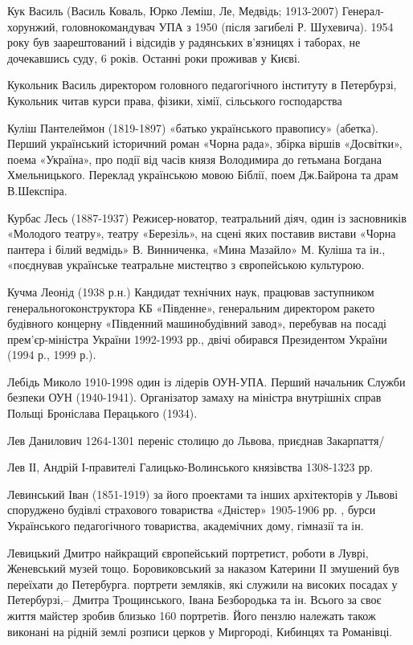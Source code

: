 Кук Василь (Василь Коваль, Юрко Леміш, Ле, Медвідь; 1913-2007) Генерал-хорунжий, головнокомандувач УПА з 1950 (після загибелі Р. Шухевича). 1954 року був заарештований і відсидів у радянських в'язницях і таборах, не дочекавшись суду, 6 років. Останні роки проживав у Києві.

Кукольник Василь директором головного педагогічного інституту в Петербурзі, Кукольник читав курси права, фізики, хімії, сільського господарства

Куліш Пантелеймон (1819-1897) «батько українського правопису» (абетка). Перший український історичний роман «Чорна рада», збірка віршів «Досвітки», поема «Україна»,  про події від часів князя Володимира до гетьмана Богдана Хмельницького. Переклад українською мовою Біблії, поем Дж.Байрона та драм В.Шекспіра.

Курбас Лесь (1887-1937) Режисер-новатор, театральний діяч, один із засновників «Молодого театру», театру «Березіль», на сцені яких поставив вистави «Чорна пантера і білий ведмідь» В. Винниченка, «Мина Мазайло» М. Куліша та ін., «поєднував українське театральне мистецтво з європейською культурою.

Кучма Леонід (1938 р.н.) Кандидат технічних наук, працював заступником генеральногоконструктора КБ «Південне», генеральним директором ракето будівного концерну «Південний машинобудівний завод», перебував на посаді прем’єр-міністра України 1992-1993 рр., двічі обирався Президентом України (1994 р., 1999 р.).

Лебідь Миколо 1910-1998 один із лідерів ОУН-УПА. Перший начальник Служби безпеки ОУН (1940-1941). Організатор замаху на міністра внутрішніх справ Польщі Броніслава Перацького (1934). 

Лев Данилович 1264-1301 переніс столицю до Львова, приєднав Закарпаття/

Лев ІІ, Андрій І-правителі Галицько-Волинського князівства 1308-1323 рр.

Левинський Іван (1851-1919) за його проектами та інших архітекторів у Львові споруджено будівлі страхового товариства «Дністер» 1905-1906 рр. , бурси Українського педагогічного товариства, академічних дому, гімназії та ін.

Левицький Дмитро найкращий європейський портретист, роботи в Луврі, Женевський музей тощо. Боровиковський за наказом Катерини ІІ змушений був переїхати до Петербурга. портрети земляків, які служили на високих посадах у Петербурзі,– Дмитра Трощинського, Івана Безбородька та ін. Всього за своє життя майстер зробив близько 160 портретів. Його пензлю належать також виконані на рідній землі розписи церков у Миргороді, Кибинцях та Романівці.

